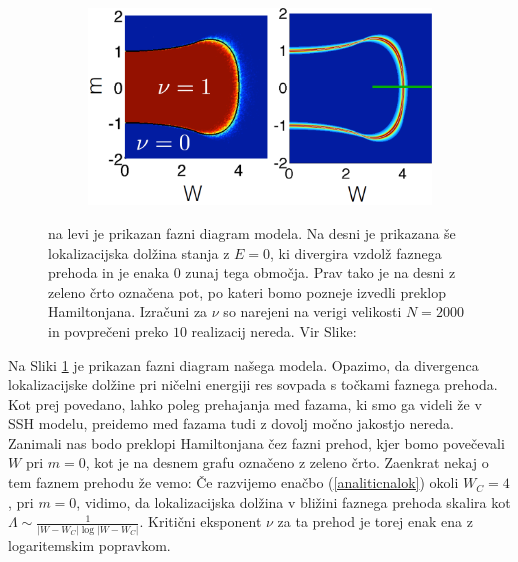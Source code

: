 \begin{figure}[H]
\centering
\begin{subfigure}{.7\textwidth}
\includegraphics[width=\linewidth]{Figures/CriticalSurface.png}
\end{subfigure}
\caption{na levi je prikazan fazni diagram modela. Na desni je prikazana še lokalizacijska dolžina stanja z $E=0$, ki divergira vzdolž faznega prehoda in je enaka $0$ zunaj tega območja. Prav tako je na desni z zeleno črto označena pot, po kateri bomo pozneje izvedli preklop Hamiltonjana. Izračuni za $\nu$ so narejeni na verigi velikosti $N=2000$ in povprečeni preko $10$ realizacij nereda. Vir Slike: \cite{mondragon}}
\label{fig:CriticalSurface}
\end{figure}

Na Sliki \ref{fig:CriticalSurface} je prikazan fazni diagram našega modela. Opazimo, da divergenca lokalizacijske dolžine pri ničelni energiji res sovpada s točkami faznega prehoda. Kot prej povedano, lahko poleg prehajanja med fazama, ki smo ga videli že v SSH modelu, preidemo med fazama tudi z dovolj močno jakostjo nereda. Zanimali nas bodo preklopi Hamiltonjana čez fazni prehod, kjer bomo povečevali $W$ pri $m=0$, kot je na desnem grafu označeno z zeleno črto.
Zaenkrat nekaj o tem faznem prehodu že vemo: Če razvijemo enačbo (\ref{analiticnalok}) okoli $W_C=4$, pri $m=0$, vidimo, da lokalizacijska dolžina v bližini faznega prehoda skalira kot $\Lambda \sim \frac{1}{|W-W_C| \log |W-W_C|}$. Kritični eksponent $\nu$ za ta prehod je torej enak ena z logaritemskim popravkom.

